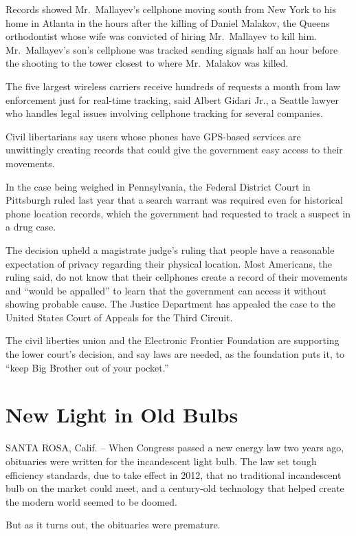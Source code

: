 ﻿\documentclass[12pt]{article}
\begin{document}
Records showed Mr.~Mallayev's cellphone moving south from New York to his home in Atlanta in the
hours after the killing of Daniel Malakov, the Queens orthodontist whose wife was convicted of
hiring Mr.~Mallayev to kill him. Mr.~Mallayev's son's cellphone was tracked sending signals half an
hour before the shooting to the tower closest to where Mr.~Malakov was killed.

The five largest wireless carriers receive hundreds of requests a month from law enforcement just
for real-time tracking, said Albert Gidari Jr., a Seattle lawyer who handles legal issues involving
cellphone tracking for several companies.

Civil libertarians say users whose phones have GPS-based services are unwittingly creating records
that could give the government easy access to their movements.

In the case being weighed in Pennsylvania, the Federal District Court in Pittsburgh ruled last year
that a search warrant was required even for historical phone location records, which the government
had requested to track a suspect in a drug case.

The decision upheld a magistrate judge's ruling that people have a reasonable expectation of privacy
regarding their physical location. Most Americans, the ruling said, do not know that their
cellphones create a record of their movements and ``would be appalled'' to learn that the government
can access it without showing probable cause. The Justice Department has appealed the case to the
United States Court of Appeals for the Third Circuit.

The civil liberties union and the Electronic Frontier Foundation are supporting the lower court's
decision, and say laws are needed, as the foundation puts it, to ``keep Big Brother out of your
pocket.''

\section{New Light in Old Bulbs}

SANTA ROSA, Calif. -- When Congress passed a new energy law two years ago, obituaries were written
for the incandescent light bulb. The law set tough efficiency standards, due to take effect in 2012,
that no traditional incandescent bulb on the market could meet, and a century-old technology that
helped create the modern world seemed to be doomed.

But as it turns out, the obituaries were premature.
\end{document}
